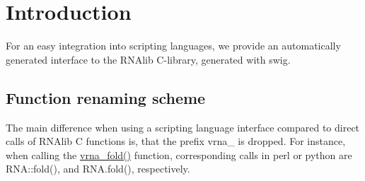 \hypertarget{swig_interface_swig_intro}{}\section{Introduction}\label{swig_interface_swig_intro}
For an easy integration into scripting languages, we provide an automatically generated interface to the R\+N\+Alib C-\/library, generated with swig.\hypertarget{swig_interface_swig_renaming}{}\subsection{Function renaming scheme}\label{swig_interface_swig_renaming}
The main difference when using a scripting language interface compared to direct calls of R\+N\+Alib C functions is, that the prefix \textquotesingle{}vrna\+\_\+\textquotesingle{} is dropped. For instance, when calling the \hyperlink{group__mfe__fold__single_gae7ca49ffb3086f145da36c964a7cec64}{vrna\+\_\+fold()} function, corresponding calls in perl or python are R\+N\+A\+::fold(), and R\+N\+A.\+fold(), respectively.

